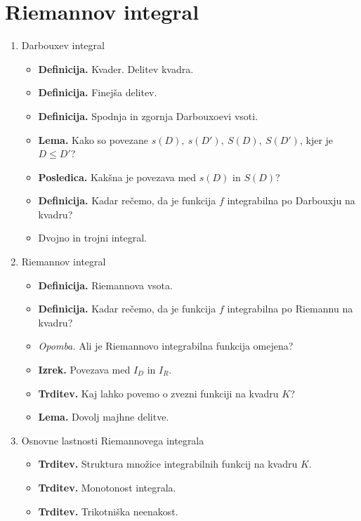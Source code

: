 \section{Riemannov integral}
\begin{enumerate}
    \item Darbouxev integral
    \begin{itemize}
        \item \colorbox{purple!30}{\textbf{Definicija.}} Kvader. Delitev kvadra.
        \item \colorbox{purple!30}{\textbf{Definicija.}} Finejša delitev.
        \item \colorbox{purple!30}{\textbf{Definicija.}} Spodnja in zgornja Darbouxoevi vsoti.
        \item \colorbox{blue!30}{\textbf{Lema.}} Kako so povezane \(s(D), \ s(D'), \ S(D), \ S(D')\), kjer je \(D \leq D'\)?
        \item \colorbox{orange!30}{\textbf{Posledica.}} Kakšna je povezava med \(s(D)\) in \(S(D)\)?
        \item \colorbox{purple!30}{\textbf{Definicija.}} Kadar rečemo, da je funkcija \(f\) integrabilna po Darbouxju na kvadru?
        \item Dvojno in trojni integral.
    \end{itemize}

    \item Riemannov integral
    \begin{itemize}
        \item \colorbox{purple!30}{\textbf{Definicija.}} Riemannova vsota.
        \item \colorbox{purple!30}{\textbf{Definicija.}} Kadar rečemo, da je funkcija \(f\) integrabilna po Riemannu na kvadru?
        \item \colorbox{yellow!30}{\emph{Opomba.}} Ali je Riemannovo integrabilna funkcija omejena?
        \item \colorbox{blue!30}{\textbf{Izrek.}} Povezava med \(I_D\) in \(I_R\).
        \item \colorbox{blue!30}{\textbf{Trditev.}} Kaj lahko povemo o zvezni funkciji na kvadru \(K\)?
        \item \colorbox{blue!30}{\textbf{Lema.}} Dovolj majhne delitve. \todo
    \end{itemize}

    \item Osnovne lastnosti Riemannovega integrala
    \begin{itemize}
        \item \colorbox{blue!30}{\textbf{Trditev.}} Struktura množice integrabilnih funkcij na kvadru \(K\).
        \item \colorbox{blue!30}{\textbf{Trditev.}} Monotonost integrala.
        \item \colorbox{blue!30}{\textbf{Trditev.}} Trikotniška neenakost.
    \end{itemize}


\end{enumerate}
